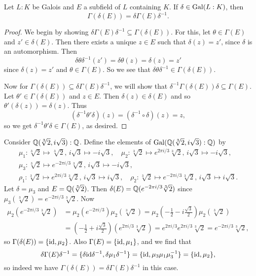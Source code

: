 \begin{theorem}
  \label{thm:conjugate}
  Let $L : K$ be Galois and $E$ a subfield of $L$
  containing $K$. If $\delta \in \operatorname{Gal}(L : K)$, then
  \[\Gamma(\delta(E)) = \delta \Gamma(E) \delta^{-1}.\]
\end{theorem}

\begin{proof}
  We begin by showing $\delta \Gamma(E) \delta^{-1} \subseteq \Gamma(\delta(E))$.
  For this, let $\theta \in \Gamma(E)$ and
  $z' \in \delta(E)$. Then there exists a unique
  $z \in E$ such that $\delta(z) = z'$, since $\delta$
  is an automorphism. Then
  \[
    \delta \theta \delta^{-1}(z')
    = \delta \theta (z) = \delta(z) = z'
  \]
  since $\delta(z) = z'$ and $\theta \in \Gamma(E)$.
  So we see that
  $\delta \theta \delta^{-1} \in \Gamma(\delta(E))$.

  Now for $\Gamma(\delta(E)) \subseteq \delta \Gamma(E) \delta^{-1}$,
  we will show that $\delta^{-1} \Gamma(\delta(E)) \delta \subseteq \Gamma(E)$.
  Let $\theta' \in \Gamma(\delta(E))$ and $z \in E$.
  Then $\delta(z) \in \delta(E)$ and so
  $\theta'(\delta(z)) = \delta(z)$. Thus
  \[
    (\delta^{-1} \theta' \delta)(z) =
    (\delta^{-1} \circ \delta)(z) = z,
  \]
  so we get $\delta^{-1} \theta' \delta \in \Gamma(E)$,
  as desired.
\end{proof}

\begin{example}
  Consider $\mathbb{Q}(\sqrt[3]{2}, i\sqrt{3}) : \mathbb{Q}$.
  Define the elements of $\operatorname{Gal}(\mathbb{Q}(\sqrt[3]{2}, i\sqrt{3}) : \mathbb{Q})$ by
  \begin{gather*}
    \mu_1 : \sqrt[3]{2} \mapsto \sqrt[3]{2},\, i\sqrt{3} \mapsto -i\sqrt{3}, \quad
    \mu_2 : \sqrt[3]{2} \mapsto e^{2\pi i / 3} \sqrt[3]{2},\, i\sqrt{3} \mapsto -i\sqrt{3}, \\
    \mu_3 : \sqrt[3]{2} \mapsto e^{-2\pi i / 3}\sqrt[3]{2},\, i\sqrt{3} \mapsto -i\sqrt{3}, \\
    \rho_1 : \sqrt[3]{2} \mapsto e^{2\pi i / 3}\sqrt[3]{2},\, i\sqrt{3} \mapsto i\sqrt{3}, \quad
    \rho_2 : \sqrt[3]{2} \mapsto e^{-2\pi i / 3}\sqrt[3]{2},\, i\sqrt{3} \mapsto i\sqrt{3}.
  \end{gather*}
  Let $\delta = \mu_3$ and $E = \mathbb{Q}(\sqrt[3]{2})$.
  Then $\delta(E) = \mathbb{Q}(e^{-2\pi i / 3}\sqrt[3]{2})$ since
  $\mu_3(\sqrt[3]{2}) = e^{-2\pi i / 3}\sqrt[3]{2}$. Now
  \begin{align*}
    \mu_2(e^{-2\pi i / 3} \sqrt[3]{2})
    &= \mu_2(e^{-2\pi i / 3}) \mu_2(\sqrt[3]{2})
    = \mu_2(-\frac{1}{2} - i\frac{\sqrt{3}}{2}) \mu_2(\sqrt[3]{2}) \\
    &= (-\frac{1}{2} + i\frac{\sqrt{3}}{{2}})(e^{2\pi i / 3} \sqrt[3]{2})
    = e^{2\pi i / 3} e^{2\pi i / 3} \sqrt[3]{2}
    = e^{-2\pi i / 3} \sqrt[3]{2},
  \end{align*}
  so $\Gamma(\delta(E)) = \{\mathrm{id}, \mu_2\}$. Also
  $\Gamma(E) = \{\mathrm{id}, \mu_1\}$, and we find that
  \[
    \delta \Gamma(E) \delta^{-1}
    = \{\delta \mathrm{id} \delta^{-1}, \delta \mu_1 \delta^{-1}\}
    = \{\mathrm{id}, \mu_3 \mu_1 \mu_3^{-1}\} = \{\mathrm{id}, \mu_2\},
  \]
  so indeed we have $\Gamma(\delta(E)) = \delta \Gamma(E) \delta^{-1}$ in this case.
\end{example}
